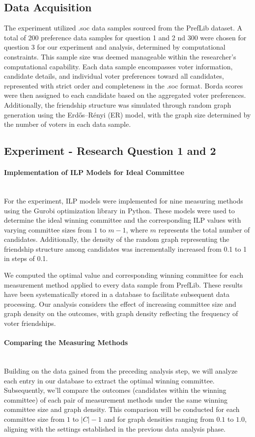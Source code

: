 \documentclass{article}
\begin{document}
\subsection{Data Acquisition}
The experiment utilized .soc data samples sourced from the PrefLib dataset. A total of 200 preference data samples for question 1 and 2 nd 300 were chosen for question 3 for our experiment and analysis, determined by computational constraints. This sample size was deemed manageable within the researcher's computational capability. Each data sample encompasses voter information, candidate details, and individual voter preferences toward all candidates, represented with strict order and completeness in the .soc format. Borda scores were then assigned to each candidate based on the aggregated voter preferences. Additionally, the friendship structure was simulated through random graph generation using the Erdős–Rényi (ER) model, with the graph size determined by the number of voters in each data sample. 

\subsection{Experiment - Research Question 1 and 2}


\paragraph*{Implementation of ILP Models for Ideal Committee}\mbox{} \\
For the experiment, ILP models were implemented for nine measuring methods using the Gurobi optimization library in Python. These models were used to determine the ideal winning committee and the corresponding ILP values with varying committee sizes from $1$ to $m-1$, where $m$ represents the total number of candidates. Additionally, the density of the random graph representing the friendship structure among candidates was incrementally increased from 0.1 to 1 in steps of 0.1. 

We computed the optimal value and corresponding winning committee for each measurement method applied to every data sample from PrefLib. These results have been systematically stored in a database to facilitate subsequent data processing. Our analysis considers the effect of increasing committee size and graph density on the outcomes, with graph density reflecting the frequency of voter friendships.  

\paragraph*{Comparing the Measuring Methods}\mbox{} \\
Building on the data gained from the preceding analysis step, we will analyze each entry in our database to extract the optimal winning committee. Subsequently, we'll compare the outcomes (candidates within the winning committee) of each pair of measurement methods under the same winning committee size and graph density. This comparison will be conducted for each committee size from $1$ to $\lvert C \rvert - 1$ and for graph densities ranging from $0.1$ to $1.0$, aligning with the settings established in the previous data analysis phase.
\end{document}
